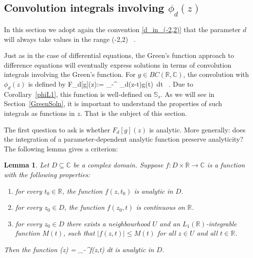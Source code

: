\documentclass[12pt]{article}
\theoremstyle{plain}
\newtheorem{lemma}[theorem]{Lemma}
\theoremstyle{definition}
\numberwithin{equation}{section}
\numberwithin{theorem}{section}
\def\be#1\ee{\begin{equation}#1\end{equation}}
\begin{document}
\subsection{Convolution integrals involving $\phi_d(z)$}
\label{section:phiconvolution}

In this section we adopt again the convention \eqref{d_in_(-2,2)} that the parameter $d$ will always take values in the range
\be
	d\in(-2,2) \ .
\ee	 

Just as in the case of differential equations, the Green's function approach to difference equations will eventually express solutions in terms of convolution integrals involving the Green's function. For $g \in BC(\mathbb{R},\mathbb{C})$,
 the convolution with $\phi_d(z)$ is defined by 
 \be\label{Fd-convolution-def}
 F_d[g](z):= \int_{-\infty}^{\infty} \phi_d(z-t)g(t)\ dt \ .\ee 
 Due to Corollary~\ref{phiL1}, this function is well-defined on $\mathbb{S}_s$. As we will see in Section~\ref{GreenSoln}, it is important to understand the properties of such integrals as functions in $z$. That is the subject of this section.

The first question to ask is whether $F_d[g](z)$ is analytic. More generally: does the integration of a parameter-dependent analytic function preserve analyticity? The following lemma gives a criterion:

\begin{lemma}\label{analyticity}
Let $D\subseteq\mathbb{C}$ be a complex domain. Suppose $f:D\times \mathbb{R} \rightarrow \mathbb{C}$ is a function with the following properties:
\begin{enumerate}
\item \label{analyticity:1} for every $t_0\in\mathbb{R}$, the function $f(z,t_0)$ is analytic in $D$.
\item \label{analyticity:2} for every $z_0\in D$, the function $f(z_0,t)$ is continuous on $\mathbb{R}$.
\item \label{analyticity:3} for every $z_0\in D$ there exists a neighbourhood $U$ and an $L_1(\mathbb{R})$-integrable function $M(t)$, such that $\left|f(z,t)\right|\leq M(t)$ for all $z\in U$ and all $t\in \mathbb{R}$.
\end{enumerate}
Then the function 
\be
F(z) = \int_{-\infty}^\infty f(z,t)\; dt
\ee 
is analytic in $D$.
\end{lemma}
\end{document}
